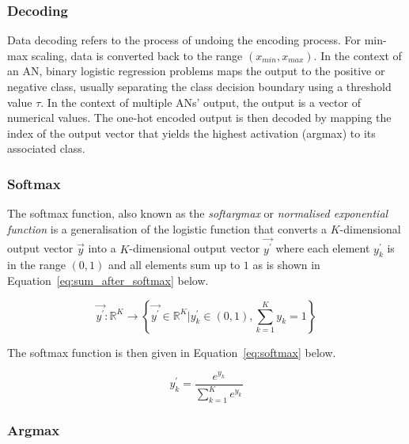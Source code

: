 \subsubsection{Decoding}\label{sec:anns:an:output:decoding}

Data decoding refers to the process of undoing the encoding process. For min-max scaling, data is converted back to the range $(x_{min}, x_{max})$. In the context of an \acs{AN}, binary logistic regression problems maps the output to the positive or negative class, usually separating the class decision boundary using a threshold value $\tau$. In the context of multiple \acp{AN}' output, the output is a vector of numerical values. The one-hot encoded output is then decoded by mapping the index of the output vector that yields the highest activation (argmax) to its associated class.

\subsubsection{Softmax}\label{sec:anns:an:output:softmax}

The softmax function, also known as the \textit{softargmax} \cite[p.~184]{ref:goodfellow:2016} or \textit{normalised exponential function} \cite{ref:bishop:2006} is a generalisation of the logistic function that converts a $K$-dimensional output vector $\vec{y}$ into a $K$-dimensional output vector $\vec{y^{'}}$ where each element $y^{'}_k$ is in the range $(0,1)$ and all elements sum up to $1$ as is shown in Equation~\eqref{eq:sum_after_softmax} below.

\begin{equation}
    \vec{y^{'}} \colon \mathbb{R}^{K} \to \left\{\vec{y^{'}} \in \mathbb{R}^{K} \vert y^{'}_k \in (0,1), \sum_{k=1}^{K} y_k = 1\right\}
    \label{eq:sum_after_softmax}
\end{equation}

\noindent
The softmax function is then given in Equation~\eqref{eq:softmax} below.

\begin{equation}
    y^{'}_k = \frac{e^{y_k}}{\sum_{k = 1}^{K}e^{y_k}}
    \label{eq:softmax}
\end{equation}


\subsubsection{Argmax}\label{sec:anns:an:output:argmax}

